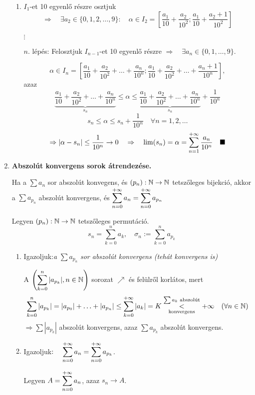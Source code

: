 \documentclass[a4paper,11.5pt]{article}
\begin{document}
\begin{enumerate}
\begin{enumerate}[1. lépés:]
			\item $I_1$-et 10 egyenlő részre osztjuk
			\[\Rightarrow\quad\exists a_2\in\{0,1,2,\ldots,9\}:\quad \alpha \in I_2=\left[\frac{a_1}{10}+\frac{a_2}{10^2};\frac{a_1}{10}+\frac{a_2+1}{10^2}\right]\]
			\begin{center}
				$\vdots$
			\end{center}
			
			\item[$n$. lépés:] Felosztjuk $I_{n-1}$-et 10 egyenlő részre \quad $\Rightarrow \quad \exists a_n\in\{0,1,\ldots,9\}.$
			
			\[\alpha\in I_n=\left[\frac{a_1}{10}+\frac{a_2}{10^2}+\ldots+\frac{a_n}{10^n};\frac{a_1}{10}+\frac{a_2}{10^2}+\ldots+\frac{a_{n}+1}{10^n}\right],\]
			azaz
			\[\underbrace{\frac{a_1}{10}+\frac{a_2}{10^2}+\ldots+\frac{a_n}{10^n}}_{s_n}\leq \alpha \leq \underbrace{\frac{a_1}{10}+\frac{a_2}{10^2}+\ldots+\frac{a_n}{10^n}}_{s_n}+\frac{1}{10^n}\]
			\[s_n\leq\alpha\leq s_n+\frac{1}{10^n}\quad \forall n=1,2,\ldots\]
			\[\Rightarrow|\alpha-s_n|\leq\frac{1}{10^n}\to0\quad \Rightarrow\quad \lim(s_n)=\alpha=\displaystyle\sum_{n=1}^{+\infty} \frac{a_n}{10^n}\quad \blacksquare\]
		\end{enumerate}
		
		\item\textbf{Abszolút konvergens sorok átrendezése.}
		
		Ha a $\sum a_n$ sor abszolút konvegens, és $(p_n): \mathbb{N} \to \mathbb{N}$ tetszőleges bijekció, akkor a $\sum a_{p_n}$ abszolút konvergens, és $\displaystyle\sum_{n=0}^{+\infty} a_n=\displaystyle\sum_{n=0}^{+\infty} a_{p_n}$
		
		\biz Legyen $(p_n):\mathbb{N}\to\mathbb{N}$ tetszőleges permutáció.
		\[s_n=\sum_{k=0}^na_k,\quad\sigma_n:=\sum_{k=0}^na_{p_k}\]
		\begin{enumerate}
			\item Igazoljuk:\quad  \textit{a} $\displaystyle\sum a_{p_n}$ \textit{sor abszolút konvergens (tehát konvergens is)}
			
			A $\displaystyle\left(\sum_{k=0}^n|a_{p_k}|, n\in \mathbb{N}\right)$ sorozat $\nearrow$ és felülről korlátos, mert 
			\[\sum_{k=0}^n|a_{p_k}|=|a_{p_0}|+\ldots+|a_{p_n}|\leq\sum_{k=0}^{+\infty}|a_k|=K\overset{\sum a_k \text{ abszolút}}{\underset{\text{konvergens}}{<}}+\infty\quad (\forall n \in \mathbb{N})\]
			$\Rightarrow\displaystyle\sum|a_{p_k}|$ abszolút konvergens, azaz $\displaystyle\sum a_{p_k}$ abszolút konvergens.
			
			\item Igazoljuk$:\quad  \displaystyle\displaystyle\sum_{n=0}^{+\infty} a_n=\displaystyle\sum_{n=0}^{+\infty} a_{p_k}$.
			
			Legyen $A=\displaystyle\sum_{n=0}^{+\infty} a_n$, azaz $s_n\to A$.
			

\end{enumerate}
\end{enumerate}
\end{document}
